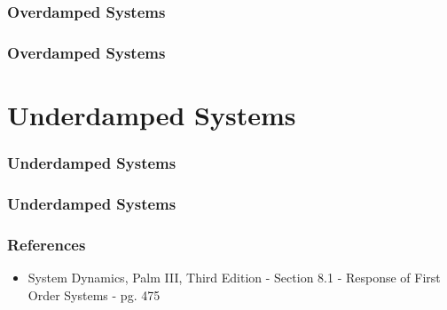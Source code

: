 \documentclass[fleqn]{beamer} %
\newcommand{\sectiontitleII}{Overdamped Systems}
\newcommand{\sectiontitleIII}{Underdamped Systems}
\begin{document}
	\begin{frame}[label=sectionII] \small
		\frametitle{\sectiontitleII}
             
            

	\end{frame}
	
	\begin{frame} \small
		\frametitle{\sectiontitleII}
             
            

	\end{frame}
	
\section{\sectiontitleIII}

	\begin{frame}[label=sectionIII] \small
		\frametitle{\sectiontitleIII}
             
            

	\end{frame}
	
	\begin{frame} \small
		\frametitle{\sectiontitleIII}
             
            

	\end{frame}



\begin{frame} \small

\frametitle{References}

\begin{itemize}
	\item System Dynamics, Palm III, Third Edition - Section 8.1 - Response of First Order Systems - pg. 475
\end{itemize}


\end{frame}
\end{document}
